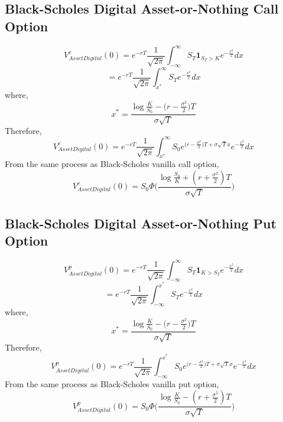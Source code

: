 \documentclass{article}
\begin{document}
\subsection{Black-Scholes Digital Asset-or-Nothing Call Option}
$$
V^{c}_{Asset Digital}(0) = e^{-rT}\frac{1}{\sqrt{2\pi}}\int_{-\infty}^{\infty}S_T\mathbf{1}_{S_T>K}e^{-\frac{x^{2}}{2}}dx
$$
$$
= e^{-rT}\frac{1}{\sqrt{2\pi}}\int_{x^{*}}^{\infty}S_Te^{-\frac{x^{2}}{2}}dx
$$
where,
$$
x^{*} = \frac{\log{\frac{K}{S_0}}-\big(r-\frac{\sigma^{2}}{2}\big)T}{\sigma\sqrt{T}} 
$$
Therefore,
$$
V^{c}_{Asset Digital}(0) = e^{-rT}\frac{1}{\sqrt{2\pi}}\int_{x^{*}}^{\infty}S_0e^{\big(r-\frac{\sigma^{2}}{2}\big)T +\sigma\sqrt{T}x}e^{-\frac{x^{2}}{2}}dx
$$
From the same process as Black-Scholes vanilla call option,
$$
 V^{c}_{Asset Digital}(0) = S_0\Phi\Bigg(\frac{\log{\frac{S_0}{K}}+(r+\frac{\sigma^{2}}{2})T}{\sigma\sqrt{T}} \Bigg)
$$

\subsection{Black-Scholes Digital Asset-or-Nothing Put Option}
$$
V^{p}_{Asset Digital}(0) = e^{-rT}\frac{1}{\sqrt{2\pi}}\int_{-\infty}^{\infty}S_T\mathbf{1}_{K>S_T}e^{-\frac{x^{2}}{2}}dx
$$
$$
= e^{-rT}\frac{1}{\sqrt{2\pi}}\int_{-\infty}^{x^{*}}S_Te^{-\frac{x^{2}}{2}}dx
$$
where,
$$
x^{*} = \frac{\log{\frac{K}{S_0}}-\big(r-\frac{\sigma^{2}}{2}\big)T}{\sigma\sqrt{T}} 
$$
Therefore,
$$
V^{p}_{Asset Digital}(0) = e^{-rT}\frac{1}{\sqrt{2\pi}}\int_{-\infty}^{x^{*}}S_0e^{\big(r-\frac{\sigma^{2}}{2}\big)T +\sigma\sqrt{T}x}e^{-\frac{x^{2}}{2}}dx
$$
From the same process as Black-Scholes vanilla put option,
$$
V^{p}_{Asset Digital}(0) = S_0\Phi\Bigg(\frac{\log{\frac{K}{S_0}}-(r+\frac{\sigma^{2}}{2})T}{\sigma\sqrt{T}}\Bigg)
$$
\end{document}

